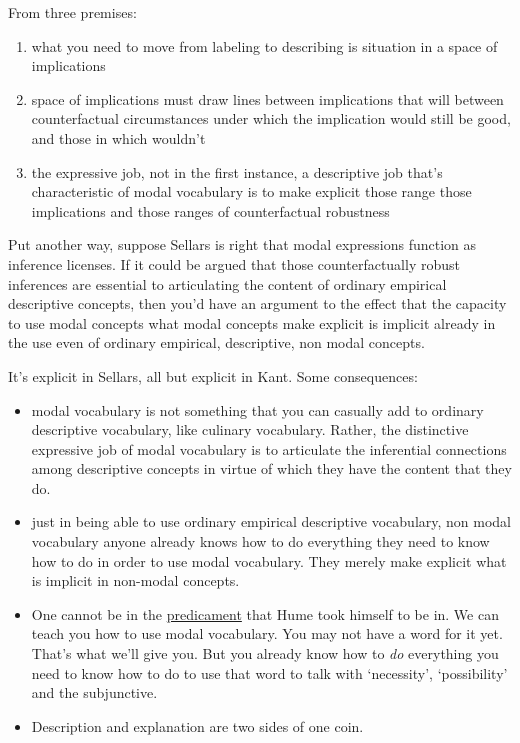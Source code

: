 From three premises:
\begin{enumerate}
\item what you need to move from labeling to describing is situation in a space of implications
\item space of implications must draw lines between implications that will between counterfactual circumstances under which the implication would still be good, and those in which wouldn't
\item the expressive job, not in the first instance, a descriptive job that's characteristic of modal vocabulary is to make explicit those range those implications and those ranges of counterfactual robustness
\end{enumerate}

Put another way, suppose Sellars is right that modal expressions function as inference licenses. If it could be argued that those counterfactually robust inferences are essential to articulating the content of ordinary empirical descriptive concepts, then you'd have an argument to the effect that the capacity to use modal concepts what modal concepts make explicit is implicit already in the use even of ordinary empirical, descriptive, non modal concepts.

It's explicit in Sellars, all but explicit in Kant. Some consequences:
\begin{itemize}

    \item modal vocabulary is not something that you can casually add to ordinary descriptive vocabulary, like culinary vocabulary. Rather, the distinctive expressive job of modal vocabulary is to articulate the inferential connections among descriptive concepts in virtue of which they have the content that they do.

    \item just in being able to use ordinary empirical descriptive vocabulary, non modal vocabulary anyone already knows how to do everything they need to know how to do in order to use modal vocabulary. They merely make explicit what is implicit in non-modal concepts.

    \item One cannot be in the \href{doc/phil/People/Hume/Predicament}{predicament} that Hume took himself to be in. We can teach you how to use modal vocabulary. You may not have a word for it yet. That's what we'll give you. But you already know how to \emph{do} everything you need to know how to do to use that word to talk with `necessity', `possibility' and the subjunctive.

    \item Description and explanation are two sides of one coin.
\end{itemize}

